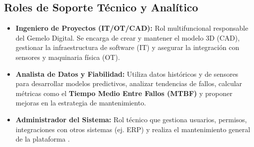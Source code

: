 \subsection{Roles de Soporte Técnico y Analítico}

\begin{itemize}
    \item \textbf{Ingeniero de Proyectos (IT/OT/CAD):} Rol multifuncional responsable del Gemelo Digital. Se encarga de crear y mantener el modelo 3D (CAD), gestionar la infraestructura de software (IT) y asegurar la integración con sensores y maquinaria física (OT).
    \item \textbf{Analista de Datos y Fiabilidad:} Utiliza datos históricos y de sensores para desarrollar modelos predictivos, analizar tendencias de fallos, calcular métricas como el \textbf{Tiempo Medio Entre Fallos (MTBF)} y proponer mejoras en la estrategia de mantenimiento.
    \item \textbf{Administrador del Sistema:} Rol técnico que gestiona usuarios, permisos, integraciones con otros sistemas (ej. ERP) y realiza el mantenimiento general de la plataforma \parencite{chen:2025, ibm:2024, laurila:2017, mrzyk:2023, osullivan:2020, stum:2018, zhang:2025}.
\end{itemize}
